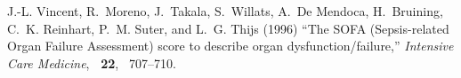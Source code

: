 \documentclass{bioinfo}
\begin{document}
\begin{thebibliography}{}
J.-L. Vincent, R.~Moreno, J.~Takala, S.~Willats, A.~{De Mendoca}, H.~Bruining,
  C.~K. Reinhart, P.~M. Suter, and L.~G. Thijs (1996) ``{The SOFA (Sepsis-related
  Organ Failure Assessment) score to describe organ dysfunction/failure},''
  {\em Intensive Care Medicine}, {\bf ~22}, ~707--710.








\end{thebibliography}
\end{document}
